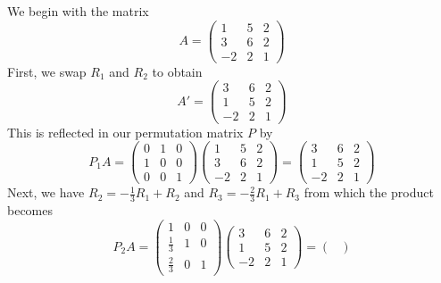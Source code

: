 \begin{solution}

  We begin with the matrix
  \[
A =
\begin{pmatrix}
           1 & 5 & 2\\
           3 & 6 & 2\\
           -2 & 2 & 1
         \end{pmatrix}
\]
  First, we swap \(R_{1}\) and \(R_{2}\) to obtain
  \[
A' =
\begin{pmatrix}
           3 & 6 & 2\\
           1 & 5 & 2\\
           -2 & 2 & 1
          \end{pmatrix}
\]
        This is reflected in our permutation matrix \(P\) by
        \[
P_{1}A =
\begin{pmatrix}
                      0 & 1 & 0\\
                      1 & 0 & 0\\
                      0 & 0 & 1
                    \end{pmatrix}
                    \begin{pmatrix}
                      1 & 5 & 2\\
                      3 & 6 & 2\\
                      -2 & 2 & 1
                    \end{pmatrix}
=
                    \begin{pmatrix}
                      3 & 6 & 2\\
                      1 & 5 & 2\\
                      -2 & 2 & 1
                    \end{pmatrix}
\]
  Next, we have \(R_{2} = -\frac{1}{3}R_{1}+R_{2}\) and \(R_{3} = -\frac{2}{3}R_{1}
  + R_{3}\) from which the product becomes
  \[
P_{2}A =
\begin{pmatrix}
                 1 & 0 & 0\\
                 \frac{1}{3} & 1 & 0\\
                 \frac{2}{3} & 0 & 1
               \end{pmatrix}
               \begin{pmatrix}
                 3 & 6 & 2\\
                 1 & 5 & 2\\
                 -2 & 2 & 1
               \end{pmatrix}
=
               \begin{pmatrix}

\end{pmatrix}\]
\end{solution}
